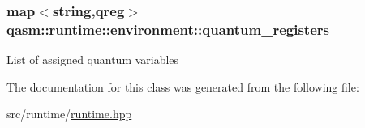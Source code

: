 \subsubsection[{\texorpdfstring{quantum\+\_\+registers}{quantum_registers}}]{\setlength{\rightskip}{0pt plus 5cm}map$<$string,{\bf qreg}$>$ qasm\+::runtime\+::environment\+::quantum\+\_\+registers\hspace{0.3cm}{\ttfamily [private]}}\hypertarget{classqasm_1_1runtime_1_1environment_ae65dc834296334c8b9ea6dd900210881}{}\label{classqasm_1_1runtime_1_1environment_ae65dc834296334c8b9ea6dd900210881}
List of assigned quantum variables 

The documentation for this class was generated from the following file\+:\begin{DoxyCompactItemize}
\item 
src/runtime/\hyperlink{runtime_8hpp}{runtime.\+hpp}\end{DoxyCompactItemize}
